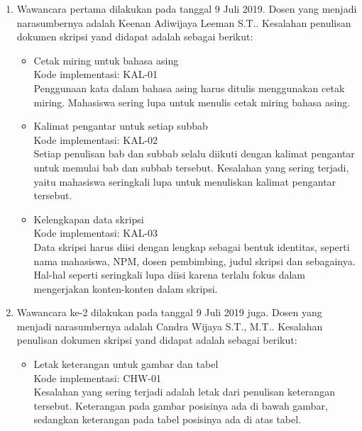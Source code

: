 \begin{enumerate}
	\item Wawancara pertama dilakukan pada tanggal 9 Juli 2019. Dosen yang menjadi narasumbernya adalah Keenan Adiwijaya Leeman S.T.. Kesalahan penulisan dokumen skripsi yand didapat adalah sebagai berikut:
		
		\begin{itemize}
			\item Cetak miring untuk bahasa asing \\
			Kode implementasi: KAL-01 \\
			Penggunaan kata dalam bahasa asing harus ditulis menggunakan cetak miring.	Mahasiswa sering lupa untuk menulis cetak miring bahasa asing.
			
			\item Kalimat pengantar untuk setiap subbab \\
			Kode implementasi: KAL-02 \\			
			Setiap penulisan bab dan subbab selalu diikuti dengan kalimat pengantar untuk memulai bab dan subbab tersebut. Kesalahan yang sering terjadi, yaitu mahasiswa seringkali lupa untuk menuliskan kalimat pengantar tersebut.
			
			\item Kelengkapan data skripsi \\
			Kode implementasi: KAL-03 \\
			Data skripsi harus diisi dengan lengkap sebagai bentuk identitas, seperti nama mahasiswa, NPM, dosen pembimbing, judul skripsi dan sebagainya. Hal-hal seperti seringkali lupa diisi karena terlalu fokus dalam mengerjakan konten-konten dalam skripsi.				
			
		\end{itemize}
		
	\item Wawancara ke-2 dilakukan pada tanggal 9 Juli 2019 juga. Dosen yang menjadi narasumbernya adalah Candra Wijaya S.T., M.T.. Kesalahan penulisan dokumen skripsi yand didapat adalah sebagai berikut:
	
		\begin{itemize}
			\item Letak keterangan untuk gambar dan tabel \\
			Kode implementasi: CHW-01 \\
			Kesalahan yang sering terjadi adalah letak dari penulisan keterangan tersebut. Keterangan pada gambar posisinya ada di bawah gambar, sedangkan keterangan pada tabel posisinya ada di atas tabel.
			

\end{itemize}
\end{enumerate}
